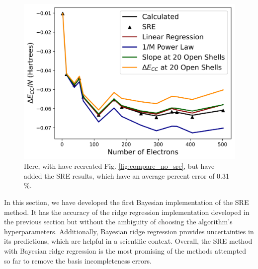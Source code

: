 \begin{figure}
    \centering
\includegraphics[scale=0.75]{Images/Chapter7/ElectronGas/EG_extrapolation_compare.png}
    \caption{Here, with have recreated Fig. \ref{fig:compare_no_sre}, but have added the SRE results, which have an average percent error of 0.31$\%$.}
    \label{fig:compare_sre}
\end{figure}

In this section, we have developed the first Bayesian implementation of the SRE method. It has the accuracy of the ridge regression implementation developed in the previous section but without the ambiguity of choosing the algorithm's hyperparameters. Additionally, Bayesian ridge regression provides uncertainties in its predictions, which are helpful in a scientific context. Overall, the SRE method with Bayesian ridge regression is the most promising of the methods attempted so far to remove the basis incompleteness errors.